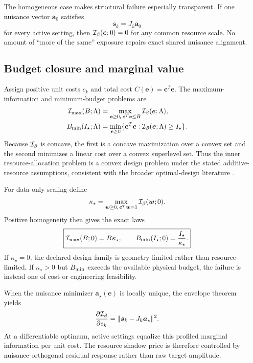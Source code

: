 The homogeneous case makes structural failure especially transparent. If one nuisance vector $\bm a_0$ satisfies
\begin{equation}
\bm s_k=J_k\bm a_0
\end{equation}
for every active setting, then $\mathcal I_{\beta}(\bm e;0)=0$ for any common resource scale. No amount of ``more of the same'' exposure repairs exact shared nuisance alignment.

\subsection{Budget closure and marginal value}

Assign positive unit costs $c_k$ and total cost $C(\bm e)=\bm c^T\bm e$. The maximum-information and minimum-budget problems are
\begin{align}
\mathcal I_{\max}(B;\Lambda)
&=\max_{\bm e\ge0,\,\bm c^T\bm e\le B}\mathcal I_{\beta}(\bm e;\Lambda),
\label{eq:maxinfo}\\
B_{\min}(I_\star;\Lambda)
&=\min_{\bm e\ge0}\{\bm c^T\bm e:\mathcal I_{\beta}(\bm e;\Lambda)\ge I_\star\}.
\label{eq:minbudget}
\end{align}
Because $\mathcal I_{\beta}$ is concave, the first is a concave maximization over a convex set and the second minimizes a linear cost over a convex superlevel set. Thus the inner resource-allocation problem is a convex design problem under the stated additive-resource assumptions, consistent with the broader optimal-design literature \cite{Huan2024,WatsonPan2023}.

For data-only scaling define
\begin{equation}
\kappa_\star=\max_{\bm w\ge0,\,\bm c^T\bm w=1}\mathcal I_{\beta}(\bm w;0).
\end{equation}
Positive homogeneity then gives the exact laws
\begin{equation}
\boxed{
\mathcal I_{\max}(B;0)=B\kappa_\star,
\qquad
B_{\min}(I_\star;0)=\frac{I_\star}{\kappa_\star}.
}
\label{eq:budgetlaw}
\end{equation}
If $\kappa_\star=0$, the declared design family is geometry-limited rather than resource-limited. If $\kappa_\star>0$ but $B_{\min}$ exceeds the available physical budget, the failure is instead one of cost or engineering feasibility.

When the nuisance minimizer $\bm a_\star(\bm e)$ is locally unique, the envelope theorem yields
\begin{equation}
\frac{\partial\mathcal I_{\beta}}{\partial e_k}
=\|\bm s_k-J_k\bm a_\star\|^2.
\label{eq:marginal}
\end{equation}
At a differentiable optimum, active settings equalize this profiled marginal information per unit cost. The resource shadow price is therefore controlled by nuisance-orthogonal residual response rather than raw target amplitude.

